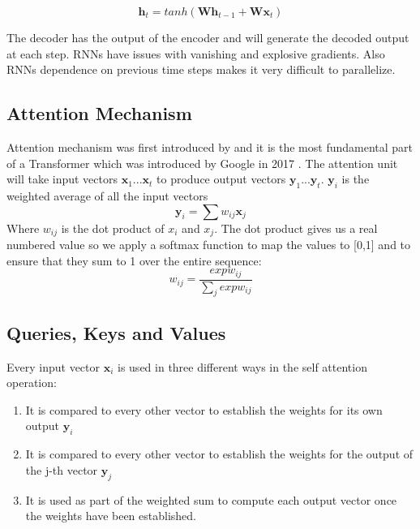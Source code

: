 \begin{equation}
    \mathbf{h}_t = tanh(\mathbf{Wh}_{t-1} + \mathbf{Wx}_t)
\end{equation}

The decoder has the output of the encoder and will generate the decoded output at each step. RNNs have issues with vanishing and explosive gradients. Also RNNs dependence on previous time
steps makes it very difficult to parallelize.

\subsection{Attention Mechanism}

Attention mechanism was first introduced by \cite{attention} and it is the most fundamental part of a Transformer which was introduced by Google in 2017 \cite{attention-is-all-you-need}. The attention unit will take input vectors $\mathbf{x}_1...\mathbf{x}_t$ to produce output vectors $\mathbf{y}_1...\mathbf{y}_t$. $\mathbf{y}_i$ is the weighted average of all the input vectors
\begin{equation}
    \mathbf{y}_i = \sum w_{ij}\mathbf{x}_j
\end{equation}
Where $w_{ij}$ is the dot product of $x_i$ and $x_j$. The dot product gives us a real numbered value so we apply a softmax function to map the values to [0,1] and to ensure that they sum to 1 over the entire sequence:
\begin{equation}
    w_{ij} = \frac{exp w_{ij}}{\sum_j exp w_{ij}}
\end{equation}
\subsection{Queries, Keys and Values}
Every input vector $\mathbf{x}_i$ is used in three different ways in the self attention operation:
\begin{enumerate}
    \item It is compared to every other vector to establish the weights for its own output $\mathbf{y}_i$
    \item It is compared to every other vector to establish the weights for the output of the j-th vector $\mathbf{y}_j$
    \item It is used as part of the weighted sum to compute each output vector once the weights have been established.

\end{enumerate}

